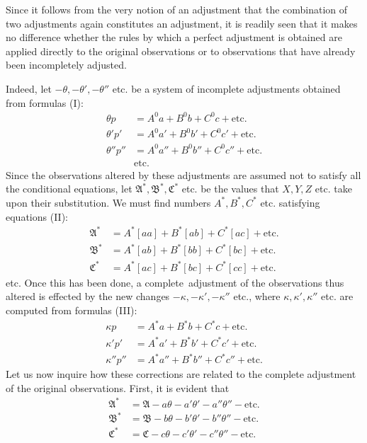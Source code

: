 Since it follows from the very notion of an adjustment that the combination of two adjustments again constitutes an adjustment, it is readily seen that it makes no difference whether the rules by which a perfect adjustment is obtained are applied directly to the original observations or to observations that have already been incompletely adjusted.

Indeed, let \(-\theta,-\theta',-\theta''\) etc. be a system of incomplete adjustments obtained from formulas (I):
\[
\begin{aligned}
\theta p&=A^0a+B^0b+C^0c+\text{etc.}\\
\theta'p'&=A^0a'+B^0b'+C^0c'+\text{etc.}\\
\theta''p''&=A^0a''+B^0b''+C^0c''+\text{etc.}\\
&\text{etc.}
\end{aligned}
\]
Since the observations altered by these adjustments are assumed not to satisfy all the conditional equations, let \(\mathfrak A^*,\mathfrak B^*,\mathfrak C^*\) etc. be the values that \(X,Y,Z\) etc. take upon their substitution. We must find numbers \(A^*,B^*,C^*\) etc. satisfying equations (II):
\[
\begin{aligned}
\mathfrak A^*&=A^*[aa]+B^*[ab]+C^*[ac]+\text{etc.}\\
\mathfrak B^*&=A^*[ab]+B^*[bb]+C^*[bc]+\text{etc.}\\
\mathfrak C^*&=A^*[ac]+B^*[bc]+C^*[cc]+\text{etc.}
\end{aligned}
\]
etc. Once this has been done, a complete\textperiodcentered\ adjustment of the observations thus altered is effected by the new changes \(-\kappa,-\kappa',-\kappa''\) etc., where \(\kappa,\kappa',\kappa''\) etc. are computed from formulas (III):
\[
\begin{aligned}
\kappa p&=A^*a+B^*b+C^*c+\text{etc.}\\
\kappa'p'&=A^*a'+B^*b'+C^*c'+\text{etc.}\\
\kappa''p''&=A^*a''+B^*b''+C^*c''+\text{etc.}
\end{aligned}
\]
Let us now inquire how these corrections are related to the complete adjustment of the original
observations. First, it is evident that
\[
\begin{aligned}
\mathfrak A^*&=\mathfrak A-a\theta-a'\theta'-a''\theta''-\text{etc.}\\
\mathfrak B^*&=\mathfrak B-b\theta-b'\theta'-b''\theta''-\text{etc.}\\
\mathfrak C^*&=\mathfrak C-c\theta-c'\theta'-c''\theta''-\text{etc.}
\end{aligned}
\]
